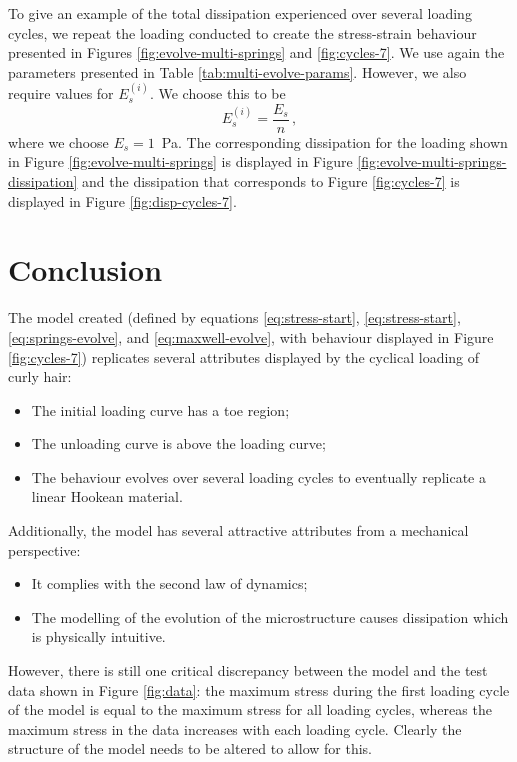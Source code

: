 \documentclass{article}
\begin{document}
To give an example of the total dissipation experienced over several loading cycles, we repeat the loading conducted to create the stress-strain behaviour presented in Figures \ref{fig:evolve-multi-springs} and \ref{fig:cycles-7}. We use again the parameters presented in Table \ref{tab:multi-evolve-params}. However, we also require values for $E_{s}^{(i)}$. We choose this to be
\begin{equation}
	E_{s}^{(i)}=\dfrac{E_{s}}{n}\,,
\end{equation}
where we choose $E_{s}=1$\, Pa. The corresponding dissipation for the loading shown in Figure \ref{fig:evolve-multi-springs} is displayed in Figure \ref{fig:evolve-multi-springs-dissipation} and the dissipation that corresponds to Figure \ref{fig:cycles-7} is displayed in Figure \ref{fig:disp-cycles-7}.


\section{Conclusion}
The model created (defined by equations \eqref{eq:stress-start}, \eqref{eq:stress-start}, \eqref{eq:springs-evolve}, and \eqref{eq:maxwell-evolve}, with behaviour displayed in Figure \ref{fig:cycles-7}) replicates several attributes displayed by the cyclical loading of curly hair:
\begin{itemize}
	\item The initial loading curve has a toe region;
	\item The unloading curve is above the loading curve;
	\item The behaviour evolves over several loading cycles to eventually replicate a linear Hookean material.
\end{itemize}
Additionally, the model has several attractive attributes from a mechanical perspective:
\begin{itemize}
	\item It complies with the second law of dynamics;
	\item The modelling of the evolution of the microstructure causes dissipation which is physically intuitive. 
\end{itemize}
However, there is still one critical discrepancy between the model and the test data shown in Figure \ref{fig:data}: the maximum stress during the first loading cycle of the model is equal to the maximum stress for all loading cycles, whereas the maximum stress in the data increases with each loading cycle. Clearly the structure of the model needs to be altered to allow for this.
\end{document}
